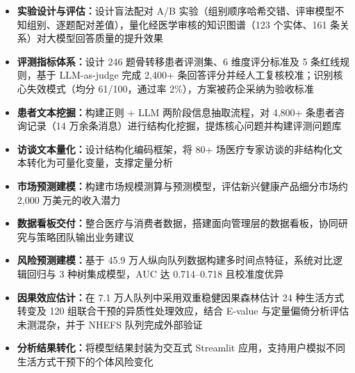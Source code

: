 
\begin{itemize}
  \item \textbf{实验设计与评估：}设计盲法配对 A/B 实验（组别顺序哈希交错、评审模型不知组别、逐题配对差值），量化经医学审核的知识图谱（123 个实体、161 条关系）对大模型回答质量的提升效果
  \item \textbf{评测指标体系：}设计 246 题骨转移患者评测集、6 维度评分标准及 5 条红线规则，基于 LLM-as-judge 完成 2,400+ 条回答评分并经人工复核校准；识别核心失效模式（均分 61/100，通过率 2\%），方案被药企采纳为验收标准
  \item \textbf{患者文本挖掘：}构建正则 + LLM 两阶段信息抽取流程，对 4,800+ 条患者咨询记录（14 万余条消息）进行结构化挖掘，提炼核心问题并构建评测问题库
\end{itemize}


\begin{itemize}
  \item \textbf{访谈文本量化：}设计结构化编码框架，将 80+ 场医疗专家访谈的非结构化文本转化为可量化变量，支撑定量分析
  \item \textbf{市场预测建模：}构建市场规模测算与预测模型，评估新兴健康产品细分市场约 2,000 万美元的收入潜力
  \item \textbf{数据看板交付：}整合医疗与消费者数据，搭建面向管理层的数据看板，协同研究与策略团队输出业务建议
\end{itemize}



\begin{itemize}
  \item \textbf{风险预测建模：}基于 45.9 万人纵向队列数据构建多时间点特征，系统对比逻辑回归与 3 种树集成模型，AUC 达 0.714–0.718 且校准度优异
  \item \textbf{因果效应估计：}在 7.1 万人队列中采用双重稳健因果森林估计 24 种生活方式转变及 120 组联合干预的异质性处理效应，结合 E-value 与定量偏倚分析评估未测混杂，并于 NHEFS 队列完成外部验证
  \item \textbf{分析结果转化：}将模型结果封装为交互式 Streamlit 应用，支持用户模拟不同生活方式干预下的个体风险变化
\end{itemize}

